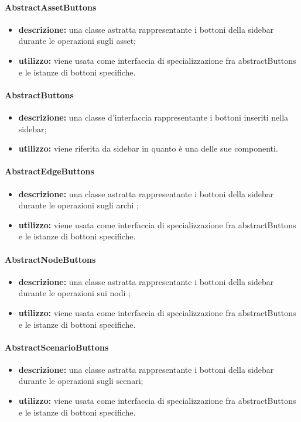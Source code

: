 \paragraph{AbstractAssetButtons}
\begin{itemize}
	\item \textbf{descrizione:} una classe astratta rappresentante i bottoni della sidebar durante le operazioni sugli asset;
	\item \textbf{utilizzo:} viene usata come interfaccia di specializzazione fra abstractButtons e le istanze di bottoni specifiche.
\end{itemize}
\paragraph{AbstractButtons}
\begin{itemize}
	\item \textbf{descrizione:} una classe d'interfaccia rappresentante i bottoni inseriti nella sidebar;
	\item \textbf{utilizzo:} viene riferita da sidebar in quanto è una delle sue componenti.
\end{itemize}
\paragraph{AbstractEdgeButtons}
\begin{itemize}
	\item \textbf{descrizione:} una classe astratta rappresentante i bottoni della sidebar durante le operazioni sugli archi
	;
	\item \textbf{utilizzo:} viene usata come interfaccia di specializzazione fra abstractButtons e le istanze di bottoni specifiche.
\end{itemize}
\paragraph{AbstractNodeButtons}
\begin{itemize}
	\item \textbf{descrizione:} una classe astratta rappresentante i bottoni della sidebar durante le operazioni sui nodi
	;
	\item \textbf{utilizzo:} viene usata come interfaccia di specializzazione fra abstractButtons e le istanze di bottoni specifiche.
\end{itemize}
\paragraph{AbstractScenarioButtons}
\begin{itemize}
	\item \textbf{descrizione:} una classe astratta rappresentante i bottoni della sidebar durante le operazioni sugli scenari;
	\item \textbf{utilizzo:} viene usata come interfaccia di specializzazione fra abstractButtons e le istanze di bottoni specifiche.
\end{itemize}
